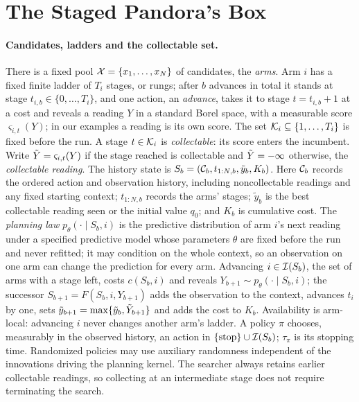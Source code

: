 \section{The Staged Pandora's Box}
\label{sec:setting}

\paragraph{Candidates, ladders and the collectable set.}
There is a fixed pool $\mathcal{X}=\{x_1,\ldots,x_N\}$ of candidates, the \emph{arms}. Arm $i$ has a fixed finite
ladder of $T_i$ stages, or rungs; after $b$ advances in total it stands at stage $t_{i,b}\in\{0,\ldots,T_i\}$,
and one action, an \emph{advance}, takes it to stage $t=t_{i,b}+1$ at a cost and reveals a
reading $Y$ in a standard Borel space, with a measurable score $\varsigma_{i,t}(Y)$; in our
examples a reading is its own score. The set $\mathcal{K}_i\subseteq\{1,\ldots,T_i\}$ is fixed before the run. A stage
$t\in\mathcal{K}_i$ is \emph{collectable}: its score
enters the incumbent. Write $\tilde Y=\varsigma_{i,t}(Y)$ if the stage reached is collectable and $\tilde Y=-\infty$
otherwise, the \emph{collectable reading}. The history state is
$S_b=(\mathcal{C}_b,t_{1:N,b},\tilde y_b,K_b)$. Here $\mathcal{C}_b$ records the ordered action and observation
history, including noncollectable readings and any fixed starting context; $t_{1:N,b}$ records
the arms' stages; $\tilde y_b$ is the best collectable reading seen or the initial value $q_0$;
and $K_b$ is cumulative cost. The \emph{planning law}
$p_\theta(\cdot\mid S_b,i)$ is the predictive distribution of arm $i$'s next reading under a
specified predictive model whose parameters $\theta$ are fixed before the run and never refitted; it may condition
on the whole context, so an observation on one arm can change the prediction for every arm.
Advancing $i\in\mathcal{I}(S_b)$, the set of arms with a stage left, costs $c(S_b,i)$ and reveals
$Y_{b+1}\sim p_\theta(\cdot\mid S_b,i)$; the successor $S_{b+1}=F(S_b,i,Y_{b+1})$ adds the
observation to the context, advances $t_i$ by one, sets
$\tilde y_{b+1}=\max\{\tilde y_b,\tilde Y_{b+1}\}$ and adds the cost to $K_b$. Availability is
arm-local: advancing $i$ never changes another arm's ladder. A policy $\pi$ chooses, measurably
in the observed history, an action in $\{\mathrm{stop}\}\cup\mathcal{I}(S_b)$; $\tau_\pi$ is its
stopping time. Randomized policies may use auxiliary randomness independent of the innovations
driving the planning kernel. The searcher always retains earlier collectable readings, so collecting at an
intermediate stage does not require terminating the search.


